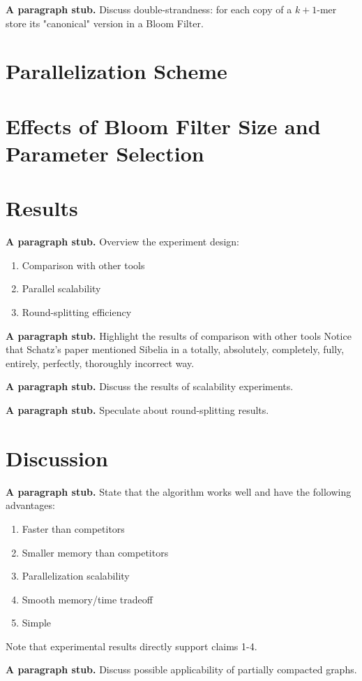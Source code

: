 \documentclass{llncs}
\newcommand{\stub}{\textbf{A paragraph stub. }}
\begin{document}
\stub Discuss double-strandness: for each copy of a $k + 1$-mer store its "canonical" version in a Bloom Filter.



\section{Parallelization Scheme}
\section{Effects of Bloom Filter Size  and Parameter Selection}
\section{Results}
\stub Overview the experiment design:

\begin{enumerate}
	\item Comparison with other tools
	\item Parallel scalability
	\item Round-splitting efficiency
\end{enumerate}

\stub Highlight the results of comparison with other tools
Notice that Schatz's paper mentioned Sibelia in a totally, absolutely, completely, fully, entirely, perfectly, thoroughly incorrect way.

\stub Discuss the results of scalability experiments.

\stub Speculate about round-splitting results.

\section{Discussion}

\stub State that the algorithm works well and have the following advantages:
\begin{enumerate}
	\item Faster than competitors
	\item Smaller memory than competitors
	\item Parallelization scalability 
	\item Smooth memory/time tradeoff
	\item Simple
\end{enumerate}
Note that experimental results directly support claims 1-4.

\stub Discuss possible applicability of partially compacted graphs.
\end{document}
